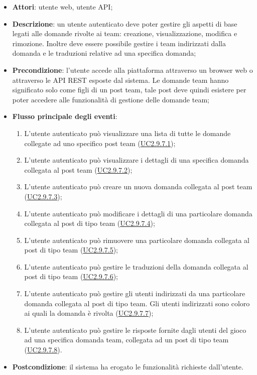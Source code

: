 \begin{itemize}
\item \textbf{Attori}: utente web, utente API;
\item \textbf{Descrizione}: un utente autenticato deve poter gestire gli aspetti di base legati alle domande rivolte ai team: creazione, visualizzazione, modifica e rimozione. Inoltre deve essere possibile gestire i team indirizzati dalla domanda e le traduzioni relative ad una specifica domanda; 
      \item \textbf{Precondizione}: l'utente accede alla piattaforma attraverso un browser web o attraverso le API REST esposte dal sistema. Le domande team hanno significato solo come figli di un post team, tale post deve quindi esistere per poter accedere alle funzionalità di gestione delle domande team;

        \item \textbf{Flusso principale degli eventi}:
          \begin{enumerate}
          \item L'utente autenticato può visualizzare una lista di tutte le domande collegate ad uno specifico post team (\hyperlink{UC2.9.7.1}{UC2.9.7.1});
          \item L'utente autenticato può visualizzare i dettagli di una specifica domanda collegata al post team (\hyperlink{UC2.9.7.2}{UC2.9.7.2});
          \item L'utente autenticato può creare un nuova domanda collegata al post team (\hyperlink{UC2.9.7.3}{UC2.9.7.3});
          \item L'utente autenticato può modificare i dettagli di una particolare domanda collegata al post di tipo team (\hyperlink{UC2.9.7.4}{UC2.9.7.4});
          \item L'utente autenticato può rimuovere una particolare domanda collegata al post di tipo team (\hyperlink{UC2.9.7.5}{UC2.9.7.5});
          \item L'utente autenticato può gestire le traduzioni della domanda collegata al post di tipo team (\hyperlink{UC2.9.7.6}{UC2.9.7.6});
          \item L'utente autenticato può gestire gli utenti indirizzati da una particolare domanda collegata al post di tipo team. Gli utenti indirizzati sono coloro ai quali la domanda è rivolta (\hyperlink{UC2.9.7.7}{UC2.9.7.7});
          \item L'utente autenticato può gestire le risposte fornite dagli utenti del gioco ad una specifica domanda team, collegata ad un post di tipo team (\hyperlink{UC2.9.7.8}{UC2.9.7.8}).

      \end{enumerate}
    \item \textbf{Postcondizione}: il sistema ha erogato le funzionalità richieste dall'utente.
  \end{itemize}
\hypertarget{UC2.9.7.1}{}
